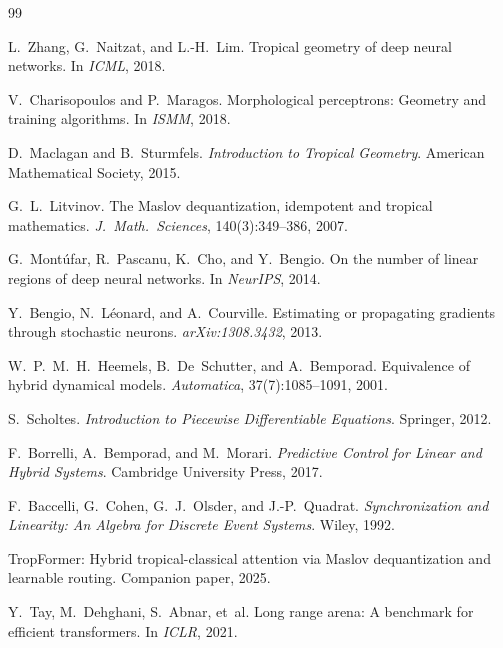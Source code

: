\documentclass[11pt,twocolumn]{article}
\begin{document}

\begin{thebibliography}{99}

L.~Zhang, G.~Naitzat, and L.-H.~Lim.
\newblock Tropical geometry of deep neural networks.
\newblock In \emph{ICML}, 2018.

V.~Charisopoulos and P.~Maragos.
\newblock Morphological perceptrons: Geometry and training algorithms.
\newblock In \emph{ISMM}, 2018.

D.~Maclagan and B.~Sturmfels.
\newblock \emph{Introduction to Tropical Geometry}.
\newblock American Mathematical Society, 2015.

G.~L.~Litvinov.
\newblock The {Maslov} dequantization, idempotent and tropical mathematics.
\newblock \emph{J.\ Math.\ Sciences}, 140(3):349--386, 2007.

G.~Mont\'{u}far, R.~Pascanu, K.~Cho, and Y.~Bengio.
\newblock On the number of linear regions of deep neural networks.
\newblock In \emph{NeurIPS}, 2014.

Y.~Bengio, N.~L\'{e}onard, and A.~Courville.
\newblock Estimating or propagating gradients through stochastic neurons.
\newblock \emph{arXiv:1308.3432}, 2013.

W.~P.~M.~H.~Heemels, B.~De~Schutter, and A.~Bemporad.
\newblock Equivalence of hybrid dynamical models.
\newblock \emph{Automatica}, 37(7):1085--1091, 2001.

S.~Scholtes.
\newblock \emph{Introduction to Piecewise Differentiable Equations}.
\newblock Springer, 2012.

F.~Borrelli, A.~Bemporad, and M.~Morari.
\newblock \emph{Predictive Control for Linear and Hybrid Systems}.
\newblock Cambridge University Press, 2017.

F.~Baccelli, G.~Cohen, G.~J.~Olsder, and J.-P.~Quadrat.
\newblock \emph{Synchronization and Linearity: An Algebra for Discrete Event
  Systems}.
\newblock Wiley, 1992.

TropFormer: Hybrid tropical-classical attention via {Maslov} dequantization
  and learnable routing.
\newblock Companion paper, 2025.

Y.~Tay, M.~Dehghani, S.~Abnar, et~al.
\newblock Long range arena: A benchmark for efficient transformers.
\newblock In \emph{ICLR}, 2021.

\end{thebibliography}
\end{document}

